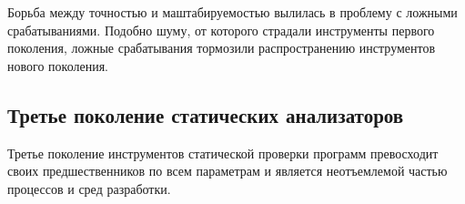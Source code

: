 Борьба между точностью и маштабируемостью вылилась в проблему с ложными срабатываниями. Подобно 
шуму, от которого страдали инструменты первого поколения, ложные срабатывания тормозили 
распространению инструментов нового поколения. 

\subsection{Третье поколение статических анализаторов}
Третье поколение инструментов статической проверки программ превосходит своих предшественников по
всем параметрам и является неотъемлемой частью процессов и сред разработки.  

\FloatBarrier
